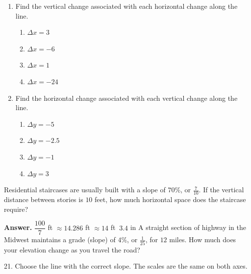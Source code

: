 \documentclass[10pt,]{book}
\theoremstyle{plain}
\theoremstyle{definition}
\theoremstyle{definition}
\theoremstyle{definition}
\theoremstyle{definition}
\numberwithin{equation}{part}
\begin{document}
\begin{exerciselist}
\begin{exercisegroup}
\begin{enumerate}[label=*\alph**]
\item\hypertarget{li-970}{}Find the vertical change associated with each horizontal change along the line. %
\begin{multicols}{2}
\begin{enumerate}[label=*\roman**]
\item\hypertarget{li-971}{}\(\Delta x = 3\)%
\item\hypertarget{li-972}{}\(\Delta x = -6\)%
\item\hypertarget{li-973}{}\(\Delta x = 1\)%
\item\hypertarget{li-974}{}\(\Delta x = -24\)%
\end{enumerate}
\end{multicols}
%
\item\hypertarget{li-975}{}Find the horizontal change associated with each vertical change along the line. %
\begin{multicols}{2}
\begin{enumerate}[label=*\roman**]
\item\hypertarget{li-976}{}\(\Delta y = -5\)%
\item\hypertarget{li-977}{}\(\Delta y = -2.5\)%
\item\hypertarget{li-978}{}\(\Delta y = -1\)%
\item\hypertarget{li-979}{}\(\Delta y = 3\)%
\end{enumerate}
\end{multicols}
%
\end{enumerate}
%
\exercise[19.]\hypertarget{exercise-234}{}Residential staircases are usually built with a slope of \(70\%\), or \(\frac{7}{10}\). If the vertical distance between stories is \(10\) feet, how much horizontal space does the staircase require?%
\par\smallskip
\noindent\textbf{Answer.}\hypertarget{answer-135}{}\quad
\(\dfrac{100}{7}\) ft \(\approx 14.286\) ft \(\approx 14\) ft \(~3.4\) in%
\exercise[20.]\hypertarget{exercise-235}{}A straight section of highway in the Midwest maintains a grade (slope) of \(4\%\), or \(\frac{1}{25}\), for \(12\) miles. How much does your elevation change as you travel the road?%
\end{exercisegroup}
\par\smallskip\noindent
\item[21.]\hypertarget{exercise-236}{}Choose the line with the correct slope. The scales are the same on both axes. \leavevmode%
\begin{multicols}{4}

\end{multicols}
\end{exerciselist}
\end{document}
